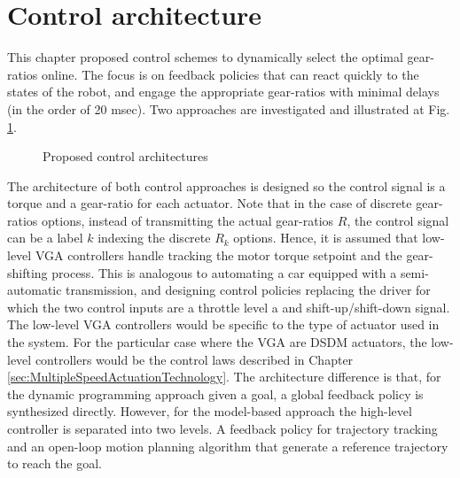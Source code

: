 \newpage

\section{Control architecture}
\label{sec:arch}

This chapter proposed control schemes to dynamically select the optimal gear-ratios online. The focus is on feedback policies that can react quickly to the states of the robot, and engage the appropriate gear-ratios with minimal delays (in the order of 20 msec). Two approaches are investigated and illustrated at Fig. \ref{fig:controlarchitectures}. 
%
\begin{figure}[H]
				\vspace{-10pt}
        \centering
				\hspace{+10pt}
        \caption{Proposed control architectures}
				\label{fig:controlarchitectures}
\end{figure}
%
The architecture of both control approaches is designed so the control signal is a torque and a gear-ratio for each actuator. Note that in the case of discrete gear-ratios options, instead of transmitting the actual gear-ratios $R$, the control signal can be a label $k$ indexing the discrete $R_k$ options. Hence, it is assumed that low-level VGA controllers handle tracking the motor torque setpoint and the gear-shifting process. This is analogous to automating a car equipped with a semi-automatic transmission, and designing control policies replacing the driver for which the two control inputs are a throttle level a and shift-up/shift-down signal. The low-level VGA controllers would be specific to the type of actuator used in the system. For the particular case where the VGA are DSDM actuators, the low-level controllers would be the control laws described in Chapter \ref{sec:MultipleSpeedActuationTechnology}. The architecture difference is that, for the dynamic programming approach given a goal, a global feedback policy is synthesized directly. However, for the model-based approach the high-level controller is separated into two levels. A feedback policy for trajectory tracking and an open-loop motion planning algorithm that generate a reference trajectory to reach the goal. 

